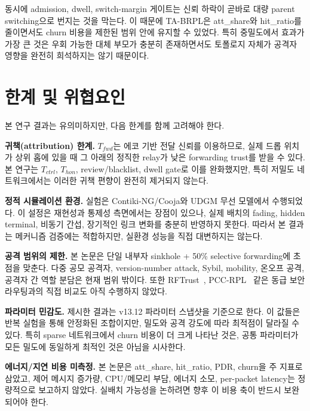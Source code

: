 \documentclass[10pt,a4paper,twocolumn]{article}
\begin{document}
동시에 admission, dwell, switch-margin 게이트는
신뢰 하락이 곧바로 대량 parent switching으로 번지는 것을 막는다.
이 때문에 TA-BRPL은 att\_share와 hit\_ratio를 줄이면서도
churn 비용을 제한된 범위 안에 유지할 수 있었다.
특히 중밀도에서 효과가 가장 큰 것은
우회 가능한 대체 부모가 충분히 존재하면서도
토폴로지 자체가 공격자 영향을 완전히 희석하지는 않기 때문이다.


\section{한계 및 위협요인}
\label{sec:discussion}

본 연구 결과는 유의미하지만, 다음 한계를 함께 고려해야 한다.

\textbf{귀책(attribution) 한계.}
$T_{fwd}$는 에코 기반 전달 신뢰를 이용하므로,
실제 드롭 위치가 상위 홉에 있을 때 그 아래의 정직한 relay가
낮은 forwarding trust를 받을 수 있다.
본 연구는 $T_{ctrl}$, $T_{hon}$, review/blacklist, dwell gate로 이를 완화했지만,
특히 저밀도 네트워크에서는 이러한 귀책 편향이 완전히 제거되지 않는다.

\textbf{정적 시뮬레이션 환경.}
실험은 Contiki-NG/Cooja와 UDGM 무선 모델에서 수행되었다.
이 설정은 재현성과 통제성 측면에서는 장점이 있으나,
실제 배치의 fading, hidden terminal, 비동기 간섭, 장기적인 링크 변화를
충분히 반영하지 못한다.
따라서 본 결과는 메커니즘 검증에는 적합하지만,
실환경 성능을 직접 대변하지는 않는다.

\textbf{공격 범위의 제한.}
본 논문은 단일 내부자 sinkhole + 50\% selective forwarding에 초점을 맞춘다.
다중 공모 공격자, version-number attack, Sybil, mobility,
온오프 공격, 공격자 간 역할 분담은 현재 범위 밖이다.
또한 RFTrust~\cite{rftrust2021}, PCC-RPL~\cite{pccrpl2022} 같은
동급 보안 라우팅과의 직접 비교도 아직 수행하지 않았다.

\textbf{파라미터 민감도.}
제시한 결과는 v13.12 파라미터 스냅샷을 기준으로 한다.
이 값들은 반복 실험을 통해 안정화된 조합이지만,
밀도와 공격 강도에 따라 최적점이 달라질 수 있다.
특히 sparse 네트워크에서 churn 비용이 더 크게 나타난 것은,
공통 파라미터가 모든 밀도에 동일하게 최적인 것은 아님을 시사한다.

\textbf{에너지/지연 비용 미측정.}
본 논문은 att\_share, hit\_ratio, PDR, churn을 주 지표로 삼았고,
제어 메시지 증가량, CPU/메모리 부담, 에너지 소모, per-packet latency는
정량적으로 보고하지 않았다.
실배치 가능성을 논하려면 향후 이 비용 축이 반드시 보완되어야 한다.


\end{document}
